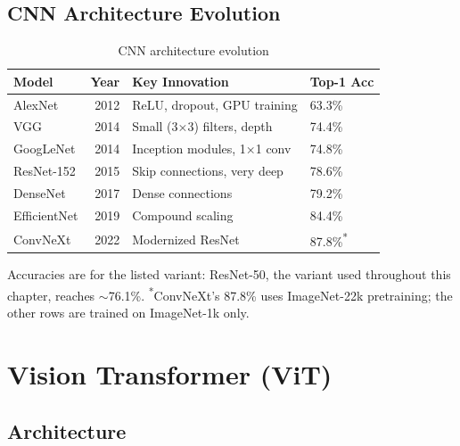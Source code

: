 \subsection{CNN Architecture Evolution}

\begin{table}[H]
\centering
\caption{CNN architecture evolution}
\begin{tabularx}{\textwidth}{lrXl}
\toprule
\textbf{Model} & \textbf{Year} & \textbf{Key Innovation} & \textbf{Top-1 Acc} \\
\midrule
AlexNet & 2012 & ReLU, dropout, GPU training & 63.3\% \\
VGG & 2014 & Small (3×3) filters, depth & 74.4\% \\
GoogLeNet & 2014 & Inception modules, 1×1 conv & 74.8\% \\
ResNet-152 & 2015 & Skip connections, very deep & 78.6\% \\
DenseNet & 2017 & Dense connections & 79.2\% \\
EfficientNet & 2019 & Compound scaling & 84.4\% \\
ConvNeXt & 2022 & Modernized ResNet & 87.8\%\textsuperscript{*} \\
\bottomrule
\end{tabularx}

\smallskip
\begin{minipage}{\textwidth}
\footnotesize Accuracies are for the listed variant: ResNet-50, the variant used throughout this chapter, reaches $\sim$76.1\%. \textsuperscript{*}ConvNeXt's 87.8\% uses ImageNet-22k pretraining; the other rows are trained on ImageNet-1k only.
\end{minipage}
\end{table}

\section{Vision Transformer (ViT)}
\label{sec:vit}

\subsection{Architecture}

